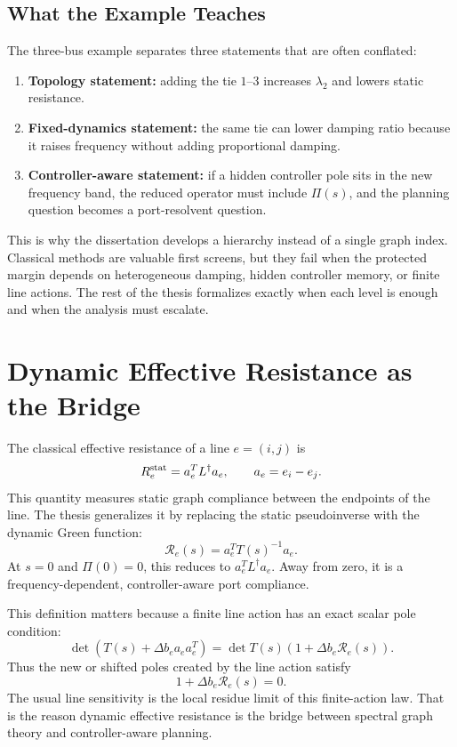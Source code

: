 \subsection{What the Example Teaches}

The three-bus example separates three statements that are often conflated:
\begin{enumerate}
\item \textbf{Topology statement:} adding the tie \(1\)--\(3\) increases
\(\lambda_2\) and lowers static resistance.
\item \textbf{Fixed-dynamics statement:} the same tie can lower damping ratio
because it raises frequency without adding proportional damping.
\item \textbf{Controller-aware statement:} if a hidden controller pole sits in
the new frequency band, the reduced operator must include \(\Pi(s)\), and the
planning question becomes a port-resolvent question.
\end{enumerate}
This is why the dissertation develops a hierarchy instead of a single graph
index. Classical methods are valuable first screens, but they fail when the
protected margin depends on heterogeneous damping, hidden controller memory, or
finite line actions. The rest of the thesis formalizes exactly when each level
is enough and when the analysis must escalate.

\section{Dynamic Effective Resistance as the Bridge}

The classical effective resistance of a line \(e=(i,j)\) is
\begin{equation}
  R_e^{\rm stat}=a_e^TL^\dagger a_e,
  \qquad a_e=e_i-e_j .
  \label{eq:framework_static_resistance}
\end{equation}
This quantity measures static graph compliance between the endpoints of the
line. The thesis generalizes it by replacing the static pseudoinverse with the
dynamic Green function:
\begin{equation}
  \mathcal R_e(s)=a_e^TT(s)^{-1}a_e .
  \label{eq:framework_dynamic_resistance}
\end{equation}
At \(s=0\) and \(\Pi(0)=0\), this reduces to
\(a_e^TL^\dagger a_e\). Away from zero, it is a frequency-dependent,
controller-aware port compliance.

This definition matters because a finite line action has an exact scalar pole
condition:
\begin{equation}
  \det\!\left(T(s)+\Delta b_ea_ea_e^T\right)
  =
  \det T(s)\left(1+\Delta b_e\mathcal R_e(s)\right).
  \label{eq:framework_line_determinant}
\end{equation}
Thus the new or shifted poles created by the line action satisfy
\begin{equation}
  1+\Delta b_e\mathcal R_e(s)=0.
  \label{eq:framework_line_condition}
\end{equation}
The usual line sensitivity is the local residue limit of this finite-action
law. That is the reason dynamic effective resistance is the bridge between
spectral graph theory and controller-aware planning.

